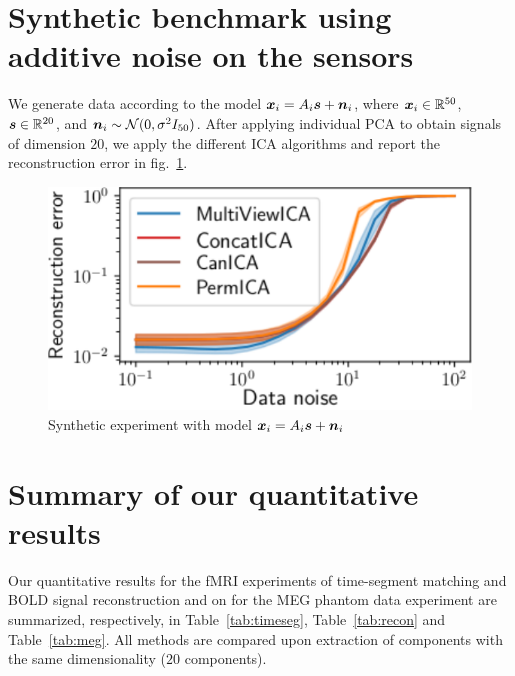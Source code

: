 \section{Synthetic benchmark using additive noise on the sensors}
\label{app:complex_cov}
We generate data according to the model $\boldsymbol{x}_i = A_i\boldsymbol{s} + \boldsymbol{n}_i$, where $\boldsymbol{x}_i \in \mathbb{R}^{50}$, $\boldsymbol{s} \in \mathbb{R}^{20}$, and $\boldsymbol{n}_i\sim \mathcal{N}(0, \sigma^2 I_{50})$. After applying individual PCA to obtain signals of dimension $20$, we apply the different ICA algorithms and report the reconstruction error in fig.~\ref{fig:reconstruction_synth}.

\begin{figure}
  \center
  \includegraphics[width=0.5\linewidth]{figures/mvica/distance.pdf}
  \caption{Synthetic experiment with model $\boldsymbol{x}_i = A_i\boldsymbol{s} + \boldsymbol{n}_i$} %
  \label{fig:reconstruction_synth}
\end{figure}

\section{Summary of our quantitative results}
\label{sec:app_real_data}
Our quantitative results for the fMRI experiments of time-segment matching and BOLD signal reconstruction and on for the MEG phantom data experiment are summarized, respectively, in Table~\ref{tab:timeseg}, Table~\ref{tab:recon} and Table~\ref{tab:meg}. All methods are compared upon extraction of components with the same dimensionality ($20$ components).

